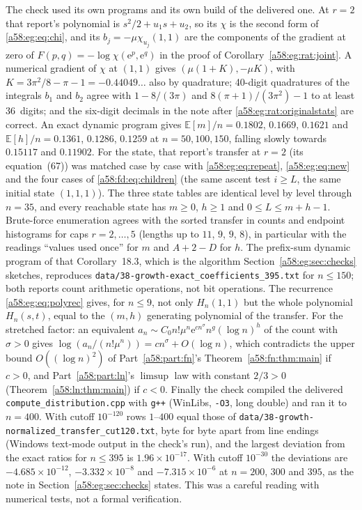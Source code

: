 \documentclass[11pt,letterpaper]{article}
\newcommand{\file}[1]{\nolinkurl{#1}}
\theoremstyle{remark}
\newcommand{\E}{\mathbb E}
\newcommand{\ee}{\mathrm e}
\begin{document}
The check used its own programs and its own build of the delivered one.
At $r=2$ that report's polynomial is $s^2/2+u_1s+u_2$, so its $\chi$ is
the second form of \eqref{a58:eg:eq:chi}, and its $b_j=-\mu\chi_{u_j}(1,1)$
are the components of the gradient at zero of
$F(p,q)=-\log\chi(\ee^p,\ee^q)$ in the proof of
Corollary~\ref{a58:eg:rat:joint}. A numerical gradient of $\chi$ at
$(1,1)$ gives $(\mu(1+K),-\mu K)$, with $K=3\pi^2/8-\pi-1=-0.44049\ldots$
also by quadrature; 40-digit quadratures of the integrals $b_1$ and $b_2$
agree with $1-8/(3\pi)$ and $8(\pi+1)/(3\pi^2)-1$ to at least 36~digits;
and the six-digit decimals in the note after
\eqref{a58:eg:rat:originalstats} are correct. An exact dynamic program
gives $\E[m]/n=0.1802$, $0.1669$, $0.1621$ and $\E[h]/n=0.1361$,
$0.1286$, $0.1259$ at $n=50,100,150$, falling slowly towards $0.15117$
and $0.11902$. For the state, that report's transfer at $r=2$ (its
equation~(67)) was matched case by case with \eqref{a58:eg:eq:repeat},
\eqref{a58:eg:eq:new} and the four cases of \eqref{a58:fd:eq:children}
(the same ascent test $i\ge L$, the same initial state $(1,1,1)$). The
three state tables are identical level by level through $n=35$, and every
reachable state has $m\ge0$, $h\ge1$ and $0\le L\le m+h-1$. Brute-force
enumeration agrees with the sorted transfer in counts and endpoint
histograms for caps $r=2,\ldots,5$ (lengths up to $11$, $9$, $9$, $8$), in
particular with the readings ``values used once'' for $m$ and $A+2-D$ for
$h$. The prefix-sum dynamic program of that Corollary~18.3, which is the
algorithm Section~\ref{a58:eg:sec:checks} sketches, reproduces
\file{data/38-growth-exact_coefficients_395.txt} for $n\le150$; both
reports count arithmetic operations, not bit operations. The recurrence
\eqref{a58:eg:eq:polyrec} gives, for $n\le9$, not only $H_n(1,1)$ but the
whole polynomial $H_n(s,t)$, equal to the $(m,h)$ generating polynomial
of the transfer. For the stretched factor: an equivalent
$a_n\sim C_0n!\mu^n\ee^{cn^\sigma}n^g(\log n)^h$ of the count with
$\sigma>0$ gives $\log(a_n/(n!\mu^n))=cn^\sigma+O(\log n)$, which
contradicts the upper bound $O((\log n)^2)$ of Part~\ref{a58:part:fn}'s
Theorem~\ref{a58:fn:thm:main} if $c>0$, and Part~\ref{a58:part:ln}'s
$\limsup$ law with constant $2/3>0$ (Theorem~\ref{a58:ln:thm:main}) if
$c<0$. Finally the check compiled the
delivered \file{compute_distribution.cpp} with \texttt{g++} (WinLibs,
\texttt{-O3}, long double) and ran it to $n=400$. With cutoff $10^{-120}$
rows $1$--$400$ equal those of
\file{data/38-growth-normalized_transfer_cut120.txt}, byte for byte apart
from line endings (Windows text-mode output in the check's run), and the
largest deviation from the exact ratios for $n\le395$ is
$1.96\times10^{-17}$. With cutoff $10^{-30}$ the deviations are
$-4.685\times10^{-12}$, $-3.332\times10^{-8}$ and $-7.315\times10^{-6}$ at
$n=200$, $300$ and $395$, as the note in Section~\ref{a58:eg:sec:checks}
states. This was a careful reading with numerical tests, not a formal
verification.
\end{document}
